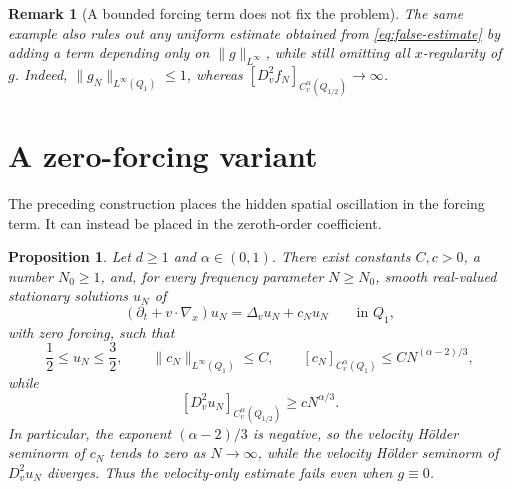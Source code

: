 \documentclass[10pt,a4paper]{amsart}
\numberwithin{equation}{section}
\newtheorem{proposition}[theorem]{Proposition}
\newtheorem{remark}[theorem]{Remark}
\begin{document}
\begin{remark}[A bounded forcing term does not fix the problem]\label{rem:g-Linfty}
The same example also rules out any uniform estimate obtained from
\eqref{eq:false-estimate} by adding a term depending only on
\(\|g\|_{L^\infty}\), while still omitting all \(x\)-regularity of
\(g\).  Indeed, \(\|g_N\|_{L^\infty(Q_1)}\le1\), whereas
\([D_v^2f_N]_{C_v^\alpha(Q_{1/2})}\to\infty\).
\end{remark}

\section{A zero-forcing variant}\label{sec:zero-forcing}

The preceding construction places the hidden spatial oscillation in the forcing term.  It can instead be placed in the zeroth-order coefficient.

\begin{proposition}\label{prop:zero-forcing}
Let \(d\ge1\) and \(\alpha\in(0,1)\).  There exist constants
\(C,c>0\), a number \(N_0\ge1\), and, for every frequency parameter
\(N\ge N_0\), smooth real-valued stationary solutions \(u_N\) of
\begin{equation}\label{eq:zero-equation}
   (\partial_t+v\cdot\nabla_x)u_N=\Delta_vu_N+c_Nu_N
   \qquad\text{in }Q_1,
\end{equation}
with zero forcing, such that
\[
   \frac12\le u_N\le\frac32,
   \qquad
   \|c_N\|_{L^\infty(Q_1)}\le C,
   \qquad
   [c_N]_{C_v^\alpha(Q_1)}\le C N^{(\alpha-2)/3},
\]
while
\[
   [D_v^2u_N]_{C_v^\alpha(Q_{1/2})}\ge cN^{\alpha/3}.
\]
In particular, the exponent \((\alpha-2)/3\) is negative, so the
velocity H\"older seminorm of \(c_N\) tends to zero as \(N\to\infty\),
while the velocity H\"older seminorm of \(D_v^2u_N\) diverges.  Thus
the velocity-only estimate fails even when \(g\equiv0\).
\end{proposition}
\end{document}
